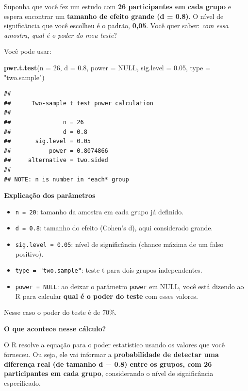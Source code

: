 \documentclass[
]{book}
\newenvironment{Shaded}{\begin{snugshade}}{\end{snugshade}}
\newcommand{\AttributeTok}[1]{\textcolor[rgb]{0.13,0.29,0.53}{#1}}
\newcommand{\ConstantTok}[1]{\textcolor[rgb]{0.56,0.35,0.01}{#1}}
\newcommand{\DecValTok}[1]{\textcolor[rgb]{0.00,0.00,0.81}{#1}}
\newcommand{\FloatTok}[1]{\textcolor[rgb]{0.00,0.00,0.81}{#1}}
\newcommand{\FunctionTok}[1]{\textcolor[rgb]{0.13,0.29,0.53}{\textbf{#1}}}
\newcommand{\NormalTok}[1]{#1}
\newcommand{\StringTok}[1]{\textcolor[rgb]{0.31,0.60,0.02}{#1}}
\providecommand{\tightlist}{%
  \setlength{\itemsep}{0pt}\setlength{\parskip}{0pt}}
\begin{document}
Suponha que você fez um estudo com \textbf{26 participantes em cada grupo} e espera encontrar um \textbf{tamanho de efeito grande (d = 0.8)}. O nível de significância que você escolheu é o padrão, \textbf{0,05}. Você quer saber: \emph{com essa amostra, qual é o poder do meu teste}?

Você pode usar:

\begin{Shaded}
\begin{Highlighting}[]
\FunctionTok{pwr.t.test}\NormalTok{(}\AttributeTok{n =} \DecValTok{26}\NormalTok{, }\AttributeTok{d =} \FloatTok{0.8}\NormalTok{, }\AttributeTok{power =} \ConstantTok{NULL}\NormalTok{, }\AttributeTok{sig.level =} \FloatTok{0.05}\NormalTok{, }\AttributeTok{type =} \StringTok{"two.sample"}\NormalTok{)}
\end{Highlighting}
\end{Shaded}

\begin{verbatim}
## 
##      Two-sample t test power calculation 
## 
##               n = 26
##               d = 0.8
##       sig.level = 0.05
##           power = 0.8074866
##     alternative = two.sided
## 
## NOTE: n is number in *each* group
\end{verbatim}

\textbf{Explicação dos parâmetros}

\begin{itemize}
\tightlist
\item
  \texttt{n\ =\ 20}: tamanho da amostra em cada grupo já definido.
\item
  \texttt{d\ =\ 0.8}: tamanho do efeito (Cohen's d), aqui considerado grande.
\item
  \texttt{sig.level\ =\ 0.05}: nível de significância (chance máxima de um falso positivo).
\item
  \texttt{type\ =\ "two.sample"}: teste t para dois grupos independentes.
\item
  \texttt{power\ =\ NULL}: ao deixar o parâmetro \texttt{power} em NULL, você está dizendo ao R para calcular \textbf{qual é o poder do teste} com esses valores.
\end{itemize}

Nesse caso o poder do teste é de 70\%.

\textbf{O que acontece nesse cálculo?}

O R resolve a equação para o poder estatístico usando os valores que você forneceu. Ou seja, ele vai informar a \textbf{probabilidade de detectar uma diferença real (de tamanho d = 0.8) entre os grupos, com 26 participantes em cada grupo}, considerando o nível de significância especificado.
\end{document}
